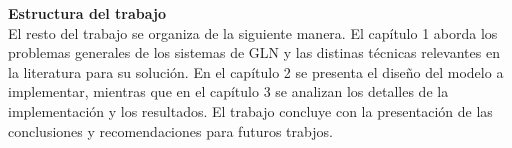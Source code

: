    \textbf{Estructura del trabajo}\\

    El resto del trabajo se organiza de la siguiente manera. El capítulo 1 aborda los problemas generales de los sistemas de GLN 
y las distinas técnicas relevantes en la literatura para su solución. En el capítulo 2 se presenta el diseño del modelo a implementar, mientras 
que en el capítulo 3 se analizan los detalles de la implementación y los resultados. El trabajo concluye con la presentación de las 
conclusiones y recomendaciones para futuros trabjos.